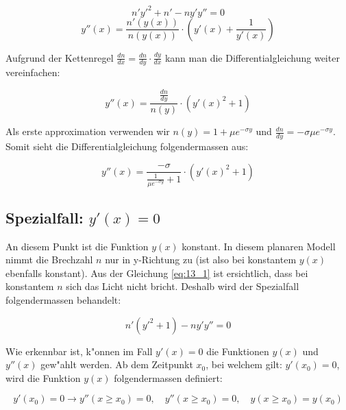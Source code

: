 $$n'y'^2 + n' - n y' y'' = 0$$
$$y''(x) = \frac{n'(y(x))}{n(y(x))} \cdot \left( y'(x) + \frac{1}{y'(x)} \right)$$

Aufgrund der Kettenregel $\frac{dn}{dx} = \frac{dn}{dy} \cdot \frac{dy}{dx}$ kann man die
Differentialgleichung weiter vereinfachen:

\begin{equation} \label{eq:planar_DGL}
y''(x) = \frac{\frac{dn}{dy}}{n(y)} \cdot \left( y'(x)^2 + 1\right)
\end{equation}

Als erste approximation verwenden wir $n(y) = 1 + \mu e^{-\sigma y}$ und $\frac{dn}{dy} =
-\sigma \mu e^{-\sigma y}$.
Somit sieht die Differentialgleichung folgendermassen aus:

\begin{equation} \label{eq:planar_DGL_n}
y''(x) = \frac{-\sigma}{\frac{1}{\mu e^{-\sigma y}} + 1} \cdot \left(
y'(x)^2 + 1 \right)
\end{equation}

\subsection{Spezialfall: $y'(x) = 0$} \label{ch:spezialfall}

An diesem Punkt ist die Funktion $y(x)$ konstant. In diesem planaren Modell nimmt die
Brechzahl $n$ nur in y-Richtung zu (ist also bei konstantem $y(x)$ ebenfalls konstant).
Aus der Gleichung \ref{eq:13_1} ist ersichtlich, dass bei konstantem $n$ sich das Licht
nicht bricht. Deshalb wird der Spezialfall folgendermassen behandelt:

$$n' (y'^2 + 1) - n y' y'' = 0$$

Wie erkennbar ist, k"onnen im Fall $y'(x) = 0$ die Funktionen $y(x)$ und $y''(x)$ gew"ahlt
werden. Ab dem Zeitpunkt $x_0$, bei welchem gilt: $y'(x_0) = 0$, wird die Funktion $y(x)$
folgendermassen definiert:

$$y'(x_0) = 0 \longrightarrow y''(x \geq x_0) = 0, \quad y''(x \geq x_0) = 0, \quad 
y(x \geq x_0) = y(x_0)$$


